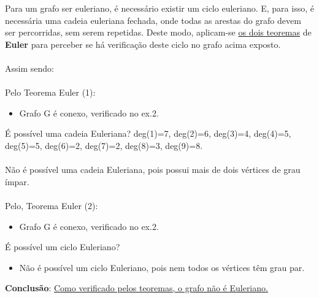 \documentclass{report}
\begin{document}
Para um grafo ser euleriano, é necessário existir um ciclo euleriano. E, para isso, é necessária uma cadeia euleriana fechada, onde todas as arestas do grafo devem ser percorridas, sem serem repetidas. Deste modo, aplicam-se \underline{os dois teoremas} de \textbf{Euler} para perceber se há verificação deste ciclo no grafo acima exposto. \\
\\ Assim sendo: \\
\\
Pelo Teorema Euler (1): \\ 
\begin{itemize}
\item  Grafo G é conexo, verificado no ex.2.\\
\end{itemize}
É possível uma cadeia Euleriana?
deg(1)=7, deg(2)=6, deg(3)=4, deg(4)=5, deg(5)=5, deg(6)=2, deg(7)=2, deg(8)=3, deg(9)=8.\\
\\Não é possível uma cadeia Euleriana, pois possui mais de dois vértices de grau ímpar.\\
\\
Pelo, Teorema Euler (2):\\
\begin{itemize}
\item Grafo G é conexo, verificado no ex.2.\\
\end{itemize}
É possível um ciclo Euleriano?
\begin{itemize}
\item Não é possível um ciclo Euleriano, pois nem todos os vértices têm grau par.
\end{itemize}
\textbf{Conclusão}: \underline {Como verificado pelos teoremas, o grafo não é Euleriano.}
\end{document}
